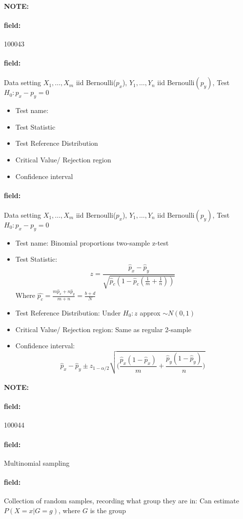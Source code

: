 \documentclass[12pt]{article}
\newenvironment{note}{\paragraph{NOTE:}}{}
\newenvironment{field}{\paragraph{field:}}{}
\begin{document}
\begin{note} \begin{field} \tiny 100043 \end{field}
 \begin{field}
  Data setting $X_1, \ldots , X_m$ iid Bernoulli($p_x$), $Y_1, \ldots, Y_n$ iid Bernoulli$(p_y)$, Test $H_0: p_x - p_y = 0$
  \begin{itemize}
   \item Test name:
   \item Test Statistic
   \item Test Reference Distribution
   \item Critical Value/ Rejection region
   \item Confidence interval
  \end{itemize}
 \end{field}
 \begin{field}
  Data setting $X_1, \ldots , X_m$ iid Bernoulli($p_x$), $Y_1, \ldots, Y_n$ iid Bernoulli$(p_y)$, Test $H_0: p_x - p_y = 0$
  \begin{itemize}
   \item Test name: Binomial proportions two-sample z-test
   \item Test Statistic: $$ z = \frac{\hat{p}_x - \hat{p}_y}{\sqrt{\hat{p}_c(1 - \hat{p}_c(\frac{1}{m} + \frac{1}{n}))}} $$ Where $\hat{p_c} = \frac{m\hat{p}_x + n\hat{p}_y}{m+n} = \frac{b + d}{N}$
   \item Test Reference Distribution: Under $H_0: z $ approx $\sim N(0,1)$
   \item Critical Value/ Rejection region: Same as regular 2-sample
   \item Confidence interval: $$  \hat{p}_x - \hat{p}_y \pm z_{1 - \alpha/2} \sqrt{\big(\frac{\hat{p}_x(1 - \hat{p}_x)}{m} + \frac{\hat{p}_y(1 - \hat{p}_y)}{n}\big)}$$
  \end{itemize}
 \end{field}
\end{note}

\begin{note} \begin{field} \tiny 100044 \end{field}
 \begin{field}
  Multinomial sampling
 \end{field}
 \begin{field}
  Collection of random samples, recording what group they are in: Can estimate $P(X = x | G = g)$, where $G$ is the group
 \end{field}
\end{note}
\end{document}
